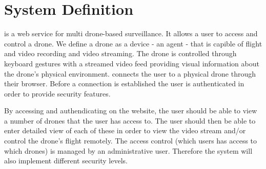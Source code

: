 \section{System Definition}
\projectname{} is a web service for multi drone-based surveillance. 
It allows a user to access and control a drone. 
We define a drone as a device - an agent - that is capible of flight and video recording and video streaming. 
The drone is controlled through keyboard gestures with a streamed video feed providing visual information about the drone's physical environment. \projectname{} connects the user to a physical drone through their browser. 
Before a connection is established the user is authenticated in order to provide security features.

By accessing and authendicating on the website, the user should be able to view a number of drones that the user has access to.
The user should then be able to enter detailed view of each of these in order to view the video stream and/or control the drone's flight remotely. 
The access control (which users has access to which drones) is managed by an administrative user.
Therefore the system will also implement different security levels. 
